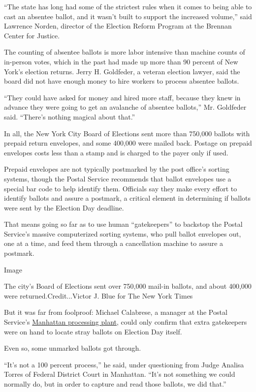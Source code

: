 ``The state has long had some of the strictest rules when it comes to
being able to cast an absentee ballot, and it wasn't built to support
the increased volume,'' said Lawrence Norden, director of the Election
Reform Program at the Brennan Center for Justice.

The counting of absentee ballots is more labor intensive than machine
counts of in-person votes, which in the past had made up more than 90
percent of New York's election returns. Jerry H. Goldfeder, a veteran
election lawyer, said the board did not have enough money to hire
workers to process absentee ballots.

``They could have asked for money and hired more staff, because they
knew in advance they were going to get an avalanche of absentee
ballots,'' Mr. Goldfeder said. ``There's nothing magical about that.''

In all, the New York City Board of Elections sent more than 750,000
ballots with prepaid return envelopes, and some 400,000 were mailed
back. Postage on prepaid envelopes costs less than a stamp and is
charged to the payer only if used.

Prepaid envelopes are not typically postmarked by the post office's
sorting systems, though the Postal Service recommends that ballot
envelopes use a special bar code to help identify them. Officials say
they make every effort to identify ballots and assure a postmark, a
critical element in determining if ballots were sent by the Election Day
deadline.

That means going so far as to use human ``gatekeepers'' to backstop the
Postal Service's massive computerized sorting systems, who pull ballot
envelopes out, one at a time, and feed them through a cancellation
machine to assure a postmark.

Image

The city's Board of Elections sent over 750,000 mail-in ballots, and
about 400,000 were returned.Credit...Victor J. Blue for The New York
Times

But it was far from foolproof: Michael Calabrese, a manager at the
Postal Service's
\href{https://www.uspsoig.gov/document/new-york-morgan-processing-and-distribution-center-efficiency}{Manhattan
processing plant}, could only confirm that extra gatekeepers were on
hand to locate stray ballots on Election Day itself.

Even so, some unmarked ballots got through.

``It's not a 100 percent process,'' he said, under questioning from
Judge Analisa Torres of Federal District Court in Manhattan. ``It's not
something we could normally do, but in order to capture and read those
ballots, we did that.''

